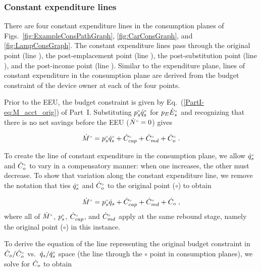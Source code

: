 \subsubsection{Constant expenditure lines} 
\label{sec:pref_graph_constant_expenditure_lines}

There are four constant expenditure lines in the consumption planes of
Figs.~\ref{fig:ExampleConsPathGraph}, \ref{fig:CarConsGraph}, and \ref{fig:LampConsGraph}.
The constant expenditure lines pass through 
the original point (line \circcirc{}), 
the post-emplacement point (line \starstar{}), 
the post-substitution point (line \hathat{}), and 
the post-income point (line \barbar{}).
Similar to the expenditure plane, 
lines of constant expenditure in the consumption plane
are derived from the budget constraint of the device owner
at each of the four points.

Prior to the EEU, the budget constraint is given by Eq.~(\ref{PartI-eq:M_acct_orig}) of Part~I.
Substituting ${}{p}^{\scriptscriptstyle \circ}_s {}{\dot{q}}^{\scriptscriptstyle \circ}_s$ for $p_E {}{\dot{E}}^{\scriptscriptstyle \circ}_s$ and 
recognizing that there is no net savings before the EEU
(${}{\dot{N}}^{\scriptscriptstyle \circ} = 0$) gives

\begin{equation}
  {}{\dot{M}}^{\scriptscriptstyle \circ} = {}{p}^{\scriptscriptstyle \circ}_s {}{\dot{q}}^{\scriptscriptstyle \circ}_s + {}{\dot{C}}^{\scriptscriptstyle \circ}_{cap} + {}{\dot{C}}^{\scriptscriptstyle \circ}_{md} + {}{\dot{C}}^{\scriptscriptstyle \circ}_o \; .
\end{equation}

To create the line of constant expenditure in the consumption plane, 
we allow ${}{\dot{q}}^{\scriptscriptstyle \circ}_s$ and ${}{\dot{C}}^{\scriptscriptstyle \circ}_o$ to vary in a compensatory manner:
when one increases, the other must decrease.
To show that variation along the constant expenditure line, 
we remove the notation that ties ${}{\dot{q}}^{\scriptscriptstyle \circ}_s$ and ${}{\dot{C}}^{\scriptscriptstyle \circ}_o$
to the original point ($\circ$) to obtain

\begin{equation}
  {}{\dot{M}}^{\scriptscriptstyle \circ} = {}{p}^{\scriptscriptstyle \circ}_s \dot{q}_s + {}{\dot{C}}^{\scriptscriptstyle \circ}_{cap} + {}{\dot{C}}^{\scriptscriptstyle \circ}_{md} + \dot{C}_o \; , 
\end{equation}
%
where all of ${}{\dot{M}}^{\scriptscriptstyle \circ}$, ${}{p}^{\scriptscriptstyle \circ}_s$, ${}{\dot{C}}^{\scriptscriptstyle \circ}_{cap}$, and ${}{\dot{C}}^{\scriptscriptstyle \circ}_{md}$
apply at the same rebound stage, 
namely the original point ($\circ$) in this instance.

To derive the equation of the line representing the original budget constraint 
in $\dot{C}_o/{}{\dot{C}}^{\scriptscriptstyle \circ}_o$ vs.\ $\dot{q}_s/{}{\dot{q}}^{\scriptscriptstyle \circ}_s$ space
(the \circcirc{} line through the $\circ$ point
in consumption planes), 
we solve for $\dot{C}_o$ to obtain

